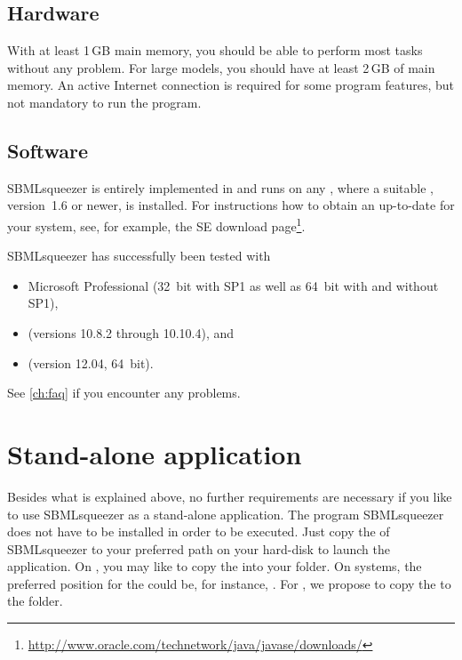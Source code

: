 \subsection{Hardware}

With at least 1\,GB main memory, you should be able to perform most tasks without any problem. For large models, you should have at least 2\,GB of main memory.
An active Internet connection is required for some program features, but not mandatory to run the program. %

\subsection{Software}\label{sec:SoftwareRequirements}

SBMLsqueezer is entirely implemented in \Java and runs on any \OS, where a 
suitable \JVM, \JDK version~1.6 or newer, is installed.
For instructions how to obtain an up-to-date \JVM for your system, see, for 
example, the \Java SE download
page\footnote{\url{http://www.oracle.com/technetwork/java/javase/downloads/}\label{fn:jvmldl}}.

SBMLsqueezer has successfully been tested with
\begin{itemize}
  \item Microsoft \WindowsSeven Professional (32~bit with SP1 as well as 64~bit with and without SP1),
  \item \MacOSX (versions 10.8.2 through 10.10.4), and
  \item \UbuntuLinux (version 12.04, 64~bit).
\end{itemize}
See \vref{ch:faq} if you encounter any problems.

\section{Stand-alone application}
\label{sec:StandAlone}

Besides what is explained above, no further requirements are necessary if you
like to use SBMLsqueezer as a stand-alone application.
The program SBMLsqueezer does not have to be installed in order to be executed.
Just copy the \JAR of SBMLsqueezer to your preferred path on your hard-disk
to launch the application.
On \MacOSX, you may like to copy the \JAR into your
folder.
On \Windows systems, the preferred position for the \JAR could be, for
instance,
.
For \Linux, we propose to copy the \JAR to the  folder.


